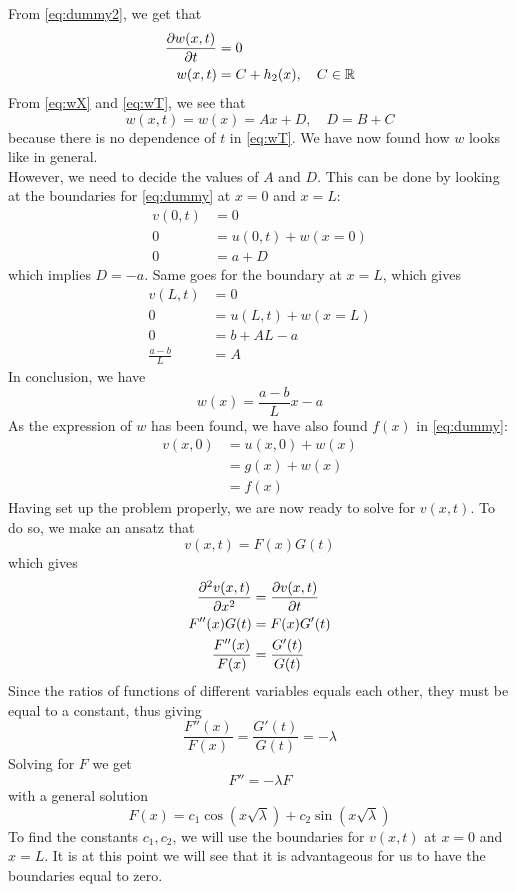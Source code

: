 \documentclass[12pt,english,a4paper]{article}
\begin{document}
From \vref{eq:dummy2}, we get that
\begin{align}
\pdv{w(x,t)}{t} &= 0 \nonumber \\
w(x,t) &= C + h_2(x) , \quad C \in \mathbb{R} \label{eq:wT}
\end{align}
From \vref{eq:wX} and \vref{eq:wT}, we see that 
\[
w(x,t) = w(x) = Ax + D, \quad D=B+C
\]
because there is no dependence of \(t\) in \vref{eq:wT}.
We have now found how \(w\) looks like in general. \\ 
However, we need to decide the values of \(A\) and \(D\). This can be done by looking at the boundaries for \vref{eq:dummy} at \(x = 0 \) and \(x = L\):
\begin{align*}
v(0,t) &= 0 \\
0 &= u(0,t) + w(x=0) \\
0 &= a+D
\end{align*}
which implies \(D = -a\). Same goes for the boundary at \(x = L\), which gives
\begin{align*}
v(L,t) &= 0 \\
0 &= u(L,t) + w(x=L) \\
0 &= b+AL-a \\
\frac{a-b}{L} &= A
\end{align*} 
In conclusion, we have 
\[
w(x) = \frac{a-b}{L}x - a
\]
As the expression of \(w\) has been found, we have also found \(f(x)\) in \vref{eq:dummy}:
\begin{align*}
	v(x,0) &= u(x,0) + w(x) \\
	&= g(x)+w(x) \\
	&=f(x)
\end{align*}
Having set up the problem properly, we are now ready to solve for \(v(x,t)\). To do so, we make an ansatz that 
\[
v(x,t) = F(x)G(t)
\]
which gives 
\begin{align}
\pdv[2]{v(x,t)}{x} &= \pdv{v(x,t)}{t} \nonumber \\
F''(x)G(t) &= F(x)G'(t) \nonumber \\
\frac{F''(x)}{F(x)} &= \frac{G'(t)}{G(t)} \label{eq:ration}
\end{align}
Since the ratios of functions of different variables equals each other, they must be equal to a constant, thus giving
\[
\frac{F''(x)}{F(x)} = \frac{G'(t)}{G(t)} = -\lambda
\]
Solving for \(F\) we get
\[
	F'' = -\lambda F
\]
with a general solution
\[
F(x) = c_1\cos(x\sqrt{\lambda} ) + c_2\sin(x\sqrt{\lambda})
\]
To find the constants \(c_1,c_2\), we will use the boundaries for \(v(x,t)\) at \(x = 0\) and \(x = L\). It is at this point we will see that it is advantageous for us to have the boundaries equal to zero.\\
\end{document}
